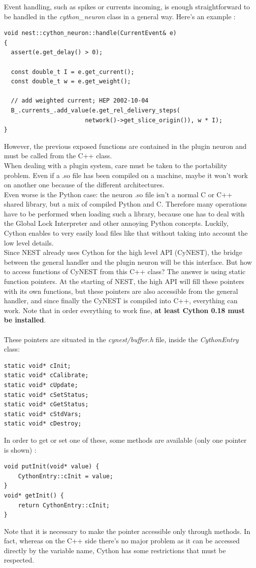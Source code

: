 \documentclass{article}
\begin{document}
Event handling, such as spikes or currents incoming, is enough straightforward to be handled in the \emph{cython\_neuron} class in a general way. Here's an example :
\begin{verbatim}
void nest::cython_neuron::handle(CurrentEvent& e)
{
  assert(e.get_delay() > 0);

  const double_t I = e.get_current();
  const double_t w = e.get_weight();

  // add weighted current; HEP 2002-10-04
  B_.currents_.add_value(e.get_rel_delivery_steps(
                       network()->get_slice_origin()), w * I);
}
\end{verbatim}
However, the previous exposed functions are contained in the plugin neuron and must be called from the C++ class.\\
When dealing with a plugin system, care must be taken to the portability problem. Even if a .so file has been compiled on a machine, maybe it won't work on another one because of the different architectures.\\
Even worse is the Python case: the neuron .so file isn't a normal C or C++ shared library, but a mix of compiled Python and C. Therefore many operations have to be performed when loading such a library, because one has to deal with the Global Lock Interpreter and other annoying Python concepts. Luckily, Cython enables to very easily load files like that without taking into account the low level details.\\
Since NEST already uses Cython for the high level API (CyNEST), the bridge between the general handler and the plugin neuron will be this interface. But how to access functions of CyNEST from this C++ class? The answer is using static function pointers. At the starting of NEST, the high API  will fill these pointers with its own functions, but these pointers are also accessible from the general handler, and since finally the CyNEST is compiled into C++, everything can work. Note that in order everything to work fine, \textbf{at least Cython 0.18 must be installed}. \\ \\
These pointers are situated in the \emph{cynest/buffer.h} file, inside the \emph{CythonEntry} class:
\begin{verbatim}
static void* cInit;
static void* cCalibrate;
static void* cUpdate;
static void* cSetStatus;
static void* cGetStatus;
static void* cStdVars;
static void* cDestroy;
\end{verbatim}
In order to get or set one of these, some methods are available (only one pointer is shown) :
\begin{verbatim}
void putInit(void* value) {
    CythonEntry::cInit = value;
}
void* getInit() {
    return CythonEntry::cInit;
}
\end{verbatim}
Note that it is necessary to make the pointer accessible only through methods. In fact, whereas on the C++ side there's no major problem as it can be accessed directly by the variable name, Cython has some restrictions that must be respected.\\
\end{document}
